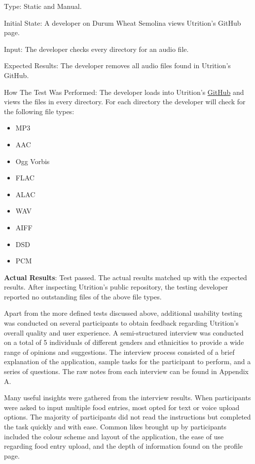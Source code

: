 \documentclass[12pt, titlepage]{article}
\begin{document}
\begin{enumerate}
		Type: Static and Manual.
		
		Initial State: A developer on Durum Wheat Semolina views Utrition’s GitHub page. 
		
		Input: The developer checks every directory for an audio file.
		
		Expected Results: The developer removes all audio files found in Utrition’s GitHub.
		
		How The Test Was Performed: The developer loads into Utrition’s \href{https://github.com/jeff-rey-wang/utrition/}{GitHub} and views the files in every directory. For each directory the developer will check for the following file types:
		
		\begin{itemize}
			\item MP3
			\item AAC
			\item Ogg Vorbis
			\item FLAC
			\item ALAC
			\item WAV
			\item AIFF
			\item DSD
			\item PCM
		\end{itemize}
	
	\textbf{Actual Results}: Test passed. The actual results matched up with the expected results. After inspecting Utrition's public repository, the testing developer reported no outstanding files of the above file types.
	
	\end{enumerate}

	Apart from the more defined tests discussed above, additional usability testing was conducted on several participants to obtain feedback regarding Utrition's overall quality and user experience. A semi-structured interview was conducted on a total of 5 individuals of different genders and ethnicities to provide a wide range of opinions and suggestions. The interview process consisted of a brief explanation of the application, sample tasks for the participant to perform, and a series of questions. The raw notes from each interview can be found in Appendix A.
	
	Many useful insights were gathered from the interview results. When participants were asked to input multiple food entries, most opted for text or voice upload options. The majority of participants did not read the instructions but completed the task quickly and with ease. Common likes brought up by participants included the colour scheme and layout of the application, the ease of use regarding food entry upload, and the depth of information found on the profile page.
	
\end{document}
